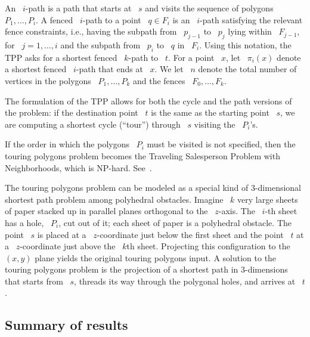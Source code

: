 \documentclass[11pt]{article}
\begin{document}
An ~\(i\)-path is a path that starts at ~\(s\) and visits the sequence of polygons ~\(P_1, \ldots, P_i\).
A fenced ~\(i\)-path to a point ~\(q \in F_i\) is an ~\(i\)-path satisfying the relevant fence constraints, i.e., having the subpath from ~\(p_{j-1}\) to ~\(p_j\) lying within ~\(F_{j-1}\), for ~\(j = 1, \ldots, i\) and the subpath from ~\(p_i\) to ~\(q\) in ~\(F_i\).
Using this notation, the TPP asks for a shortest fenced ~\(k\)-path to ~\(t\).
For a point ~\(x\), let ~\(\pi_i(x)\) denote a shortest fenced ~\(i\)-path that ends at ~\(x\).
We let ~\(n\) denote the total number of vertices in the polygons ~\(P_1, \ldots, P_k\) and the fences ~\(F_0, \ldots, F_k\).

The formulation of the TPP allows for both the cycle and the path versions of the problem: if the destination point ~\(t\) is the same as the starting point ~\(s\), we are computing a shortest cycle (``tour'') through ~\(s\) visiting the ~\(P_i\)'s.

If the order in which the polygons ~\(P_i\) must be visited is not specified, then the touring polygons problem becomes the Traveling Salesperson Problem with Neighborhoods, which is NP-hard.
See~\cite{ref20}.

The touring polygons problem can be modeled as a special kind of 3-dimensional shortest path problem among polyhedral obstacles.
Imagine ~\(k\) very large sheets of paper stacked up in parallel planes orthogonal to the ~\(z\)-axis.
The ~\(i\)-th sheet has a hole, ~\(P_i\), cut out of it; each sheet of paper is a polyhedral obstacle.
The point ~\(s\) is placed at a ~\(z\)-coordinate just below the first sheet and the point ~\(t\) at a ~\(z\)-coordinate just above the ~\(k\)th sheet.
Projecting this configuration to the ~\((x,y)\) plane yields the original touring polygons input.
A solution to the touring polygons problem is the projection of a shortest path in 3-dimensions that starts from ~\(s\), threads its way through the polygonal holes, and arrives at ~\(t\).

\subsection*{Summary of results}
\end{document}
